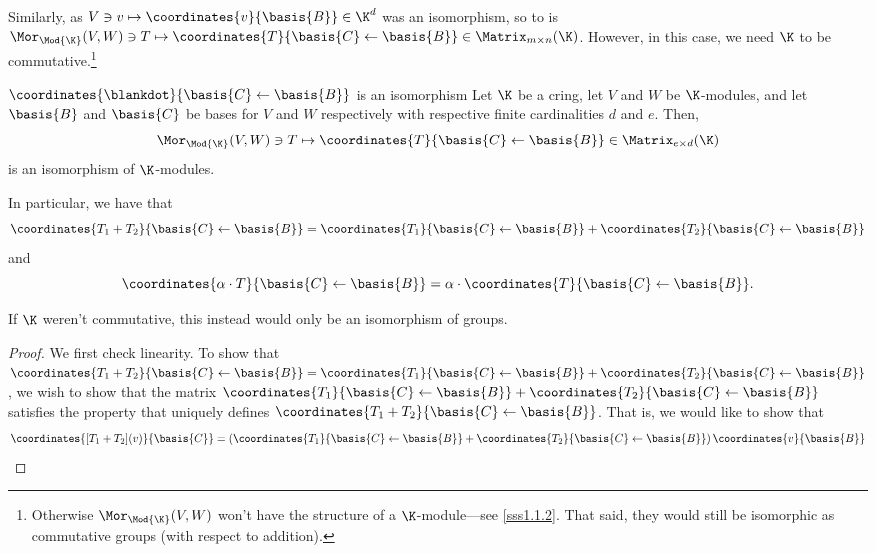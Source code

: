 Similarly, as $V\ni v\mapsto \coordinates{v}{\basis{B}}\in \K ^d$ was an isomorphism, so to is $\Mor _{\Mod{\K}}(V,W)\ni T\mapsto \coordinates{T}{\basis{C}\leftarrow \basis{B}}\in \Matrix _{m\times n}(\K )$.  However, in this case, we need $\K$ to be commutative.\footnote{Otherwise $\Mor _{\Mod{\K}}(V,W)$ won't have the structure of a $\K$-module---see \cref{sss1.1.2}.  That said, they would still be isomorphic as commutative groups (with respect to addition).}
\begin{prp}{$\coordinates{\blankdot}{\basis{C}\leftarrow \basis{B}}$ is an isomorphism}{}
	Let $\K$ be a cring, let $V$ and $W$ be $\K$-modules, and let $\basis{B}$ and $\basis{C}$ be bases for $V$ and $W$ respectively with respective finite cardinalities $d$ and $e$.  Then,
	\begin{equation}
	\Mor _{\Mod{\K}}(V,W)\ni T\mapsto \coordinates{T}{\basis{C}\leftarrow \basis{B}}\in \Matrix _{e\times d}(\K )
	\end{equation}
	is an isomorphism of $\K$-modules.
	\begin{rmk}
		In particular, we have that
		\begin{equation}
		\coordinates{T_1+T_2}{\basis{C}\leftarrow \basis{B}}=\coordinates{T_1}{\basis{C}\leftarrow \basis{B}}+\coordinates{T_2}{\basis{C}\leftarrow \basis{B}}
		\end{equation}
		and
		\begin{equation}
		\coordinates{\alpha \cdot T}{\basis{C}\leftarrow \basis{B}}=\alpha \cdot \coordinates{T}{\basis{C}\leftarrow \basis{B}}.
		\end{equation}
	\end{rmk}
	\begin{rmk}
		If $\K$ weren't commutative, this instead would only be an isomorphism of groups.
	\end{rmk}
	\begin{proof}
		We first check linearity.  To show that $\coordinates{T_1+T_2}{\basis{C}\leftarrow \basis{B}}=\coordinates{T_1}{\basis{C}\leftarrow \basis{B}}+\coordinates{T_2}{\basis{C}\leftarrow \basis{B}}$, we wish to show that the matrix $\coordinates{T_1}{\basis{C}\leftarrow \basis{B}}+\coordinates{T_2}{\basis{C}\leftarrow \basis{B}}$ satisfies the property that uniquely defines $\coordinates{T_1+T_2}{\basis{C}\leftarrow \basis{B}}$.  That is, we would like to show that
		\begin{equation}
		\coordinates{[T_1+T_2](v)}{\basis{C}}=\left( \coordinates{T_1}{\basis{C}\leftarrow \basis{B}}+\coordinates{T_2}{\basis{C}\leftarrow \basis{B}}\right) \coordinates{v}{\basis{B}}

\end{equation}
\end{proof}
\end{prp}
